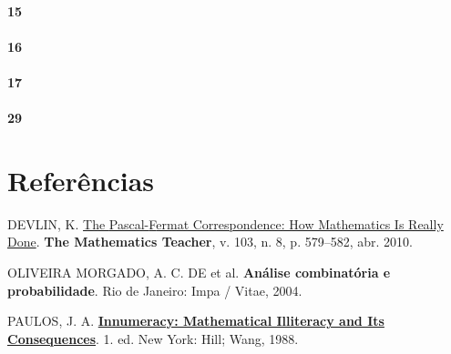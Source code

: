 \documentclass[
  11pt]{report}
\newlength{\cslhangindent}
\newlength{\cslentryspacingunit} %
\newenvironment{CSLReferences}[2] %
 {%
  \setlength{\parindent}{0pt}
  \ifodd #1
  \let\oldpar\par
  \def\par{\hangindent=\cslhangindent\oldpar}
  \fi
  \setlength{\parskip}{#2\cslentryspacingunit}
 }%
 {}
\begin{document}
\hypertarget{section-14}{%
\subsubsection*{15}\label{section-14}}

\hypertarget{section-15}{%
\subsubsection*{16}\label{section-15}}

\hypertarget{section-16}{%
\subsubsection*{17}\label{section-16}}

\hypertarget{section-17}{%
\subsubsection*{29}\label{section-17}}

\hypertarget{referuxeancias}{%
\chapter*{Referências}\label{referuxeancias}}

\hypertarget{refs}{}
\begin{CSLReferences}{0}{1}
\leavevmode{}%
DEVLIN, K. \href{https://doi.org/10.5951/mt.103.8.0579}{The {P}ascal-{F}ermat Correspondence: How Mathematics Is Really Done}. \textbf{The Mathematics Teacher}, v. 103, n. 8, p. 579--582, abr. 2010.

\leavevmode{}%
OLIVEIRA MORGADO, A. C. DE et al. \textbf{An{á}lise combinat{ó}ria e probabilidade}. Rio de Janeiro: Impa / Vitae, 2004.

\leavevmode{}%
PAULOS, J. A. \textbf{\href{http://gen.lib.rus.ec/book/index.php?md5=20A842C0E7EB7F8992EDDA0082E9B76F}{Innumeracy: Mathematical Illiteracy and Its Consequences}}. 1. ed. New York: Hill; Wang, 1988.

\end{CSLReferences}
\end{document}
